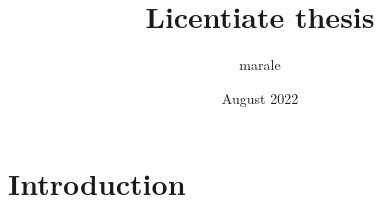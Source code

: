 \documentclass{article}
\title{Licentiate thesis}
\author{marale }
\date{August 2022}
\begin{document}
\maketitle

\section{Introduction}
\end{document}
